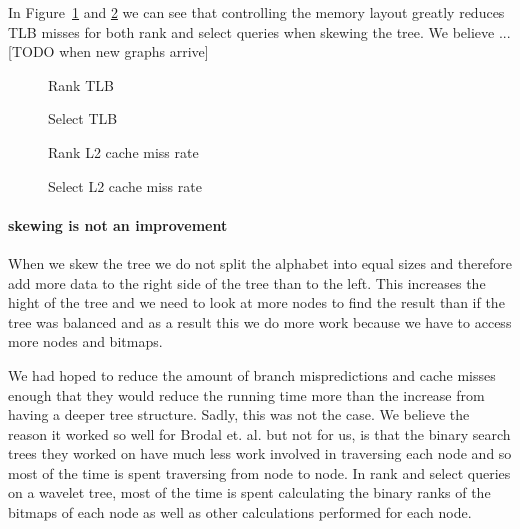 In Figure~\ref{fig:NaiveVsControlledNodeMemorySkewRankQueryTLB} and \ref{fig:NaiveVsControlledNodeMemorySkewSelectQueryTLB} we can see that controlling the memory layout greatly reduces TLB misses for both rank and select queries when skewing the tree. We believe ... [TODO when new graphs arrive]

\begin{figure}
\caption{Rank TLB}
\label{fig:NaiveVsControlledNodeMemorySkewRankQueryTLB}

\end{figure}

\begin{figure}
\caption{Select TLB}
\label{fig:NaiveVsControlledNodeMemorySkewSelectQueryTLB}

\end{figure}


\begin{figure}
\caption{Rank L2 cache miss rate}
\label{fig:NaiveVsControlledNodeMemorySkewRankQuery_L2_DCMrate}

\end{figure}

\begin{figure}
\caption{Select L2 cache miss rate}
\label{fig:NaiveVsControlledNodeMemorySkewSelectQuery_L2_DCMrate}

\end{figure}

\paragraph{skewing is not an improvement}
When we skew the tree we do not split the alphabet into equal sizes and therefore add more data to the right side of the tree than to the left. 
This increases the hight of the tree and we need to look at more nodes to find the result than if the tree was balanced and as a result this we do more work because we have to access more nodes and bitmaps.

We had hoped to reduce the amount of branch mispredictions and cache misses enough that they would reduce the running time more than the increase from having a deeper tree structure.
Sadly, this was not the case. We believe the reason it worked so well for Brodal et. al.\cite{gerthSkewedBinarySearchTrees} but not for us, is that the binary search trees they worked on have much less work involved in traversing each node and so most of the time is spent traversing from node to node.
In rank and select queries on a wavelet tree, most of the time is spent calculating the binary ranks of the bitmaps of each node as well as other calculations performed for each node.


